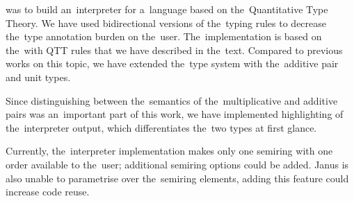 
 was to build an~interpreter for a~language based on
the~Quantitative Type Theory. We have used bidirectional versions of the~typing
rules to decrease the~type annotation burden on the~user. The~implementation
is based on the~\lc with QTT rules that we have described in the~text. Compared
to previous works on this topic, we have extended the~type system with
the~additive pair and unit types.

Since distinguishing between the~semantics of the~multiplicative and additive
pairs was an~important part of this work, we have implemented highlighting of
the~interpreter output, which differentiates the~two types at first glance.

Currently, the~interpreter implementation makes only one semiring with one order
available to the~user; additional semiring options could be added. Janus is also
unable to parametrise over the~semiring elements, adding this feature could
increase code reuse.
